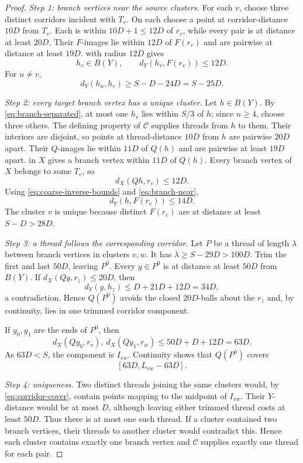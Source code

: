 \documentclass[11pt,a4paper]{article}
\theoremstyle{plain}
\theoremstyle{definition}
\theoremstyle{remark}
\newcommand{\cC}{\mathcal C}
\begin{document}
\label{pf:rigidity}
\lemrigidity*
\begin{proof}
\emph{Step 1: branch vertices near the source clusters.}
For each $v$, choose three distinct corridors incident with $T_v$. On each choose a point at corridor-distance $10D$ from $T_v$. Each is within $10D+1\le12D$ of $r_v$, while every pair is at distance at least $20D$. Their $F$-images lie within $12D$ of $F(r_v)$ and are pairwise at distance at least $19D$.  with radius $12D$ gives
\[
 h_v\in B(Y),\qquad d_Y(h_v,F(r_v))\le12D.
\tag{A.1}\label{eq:branch-near}
\]
For $u\ne v$,
\[
 d_Y(h_u,h_v)\ge S-D-24D=S-25D.
\tag{A.2}\label{eq:branch-separated}
\]

\emph{Step 2: every target branch vertex has a unique cluster.}
Let $h\in B(Y)$. By \eqref{eq:branch-separated}, at most one $h_v$ lies within $S/3$ of $h$; since $n\ge4$, choose three others. The defining property of $\cC$ supplies threads from $h$ to them. Their interiors are disjoint, so points at thread-distance $10D$ from $h$ are pairwise $20D$ apart. Their $Q$-images lie within $11D$ of $Q(h)$ and are pairwise at least $19D$ apart.  in $X$ gives a branch vertex within $11D$ of $Q(h)$. Every branch vertex of $X$ belongs to some $T_v$, so
\[
 d_X(Qh,r_v)\le12D.
\tag{A.3}\label{eq:target-cluster}
\]
Using \eqref{eq:coarse-inverse-bounds} and \eqref{eq:branch-near},
\[
 d_Y(h,F(r_v))\le14D.
\tag{A.4}\label{eq:target-near}
\]
The cluster $v$ is unique because distinct $F(r_v)$ are at distance at least $S-D>28D$.

\emph{Step 3: a thread follows the corresponding corridor.}
Let $P$ be a thread of length $\lambda$ between branch vertices in clusters $v,w$. It has $\lambda\ge S-29D>100D$. Trim the first and last $50D$, leaving $P^0$. Every $y\in P^0$ is at distance at least $50D$ from $B(Y)$. If $d_X(Qy,r_z)\le20D$, then
\[
 d_Y(y,h_z)\le D+21D+12D=34D,
\]
a contradiction. Hence $Q(P^0)$ avoids the closed $20D$-balls about the $r_z$ and, by continuity, lies in one trimmed corridor component.

If $y_0,y_1$ are the ends of $P^0$, then
\[
 d_X(Qy_0,r_v),\ d_X(Qy_1,r_w)\le50D+D+12D=63D.
\]
As $63D<S$, the component is $I_{vw}$. Continuity shows that $Q(P^0)$ covers
\[
 [63D,L_{vw}-63D].
\tag{A.5}\label{eq:corridor-cover}
\]

\emph{Step 4: uniqueness.}
Two distinct threads joining the same clusters would, by \eqref{eq:corridor-cover}, contain points mapping to the midpoint of $I_{vw}$. Their $Y$-distance would be at most $D$, although leaving either trimmed thread costs at least $50D$. Thus there is at most one such thread. If a cluster contained two branch vertices, their threads to another cluster would contradict this. Hence each cluster contains exactly one branch vertex and $\cC$ supplies exactly one thread for each pair.


\end{proof}
\end{document}
